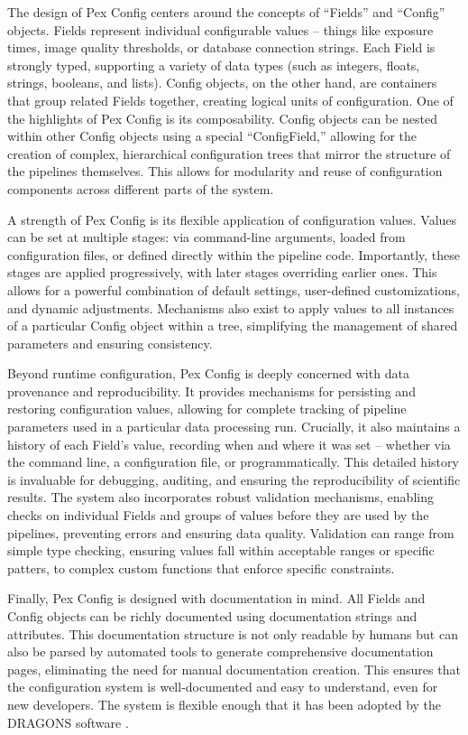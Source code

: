 The design of Pex Config centers around the concepts of ``Fields'' and ``Config'' objects.
Fields represent individual configurable values -- things like exposure times, image quality thresholds, or database connection strings.
Each Field is strongly typed, supporting a variety of data types (such as integers, floats, strings, booleans, and lists).
Config objects, on the other hand, are containers that group related Fields together, creating logical units of configuration.
One of the highlights of Pex Config is its composability.
Config objects can be nested within other Config objects using a special ``ConfigField,'' allowing for the creation of complex, hierarchical configuration trees that mirror the structure of the pipelines themselves.
This allows for modularity and reuse of configuration components across different parts of the system.

A strength of Pex Config is its flexible application of configuration values.
Values can be set at multiple stages: via command-line arguments, loaded from configuration files, or defined directly within the pipeline code.
Importantly, these stages are applied progressively, with later stages overriding earlier ones.
This allows for a powerful combination of default settings, user-defined customizations, and dynamic adjustments.
Mechanisms also exist to apply values to all instances of a particular Config object within a tree, simplifying the management of shared parameters and ensuring consistency.


Beyond runtime configuration, Pex Config is deeply concerned with data provenance and reproducibility.
It provides mechanisms for persisting and restoring configuration values, allowing for complete tracking of pipeline parameters used in a particular data processing run.
Crucially, it also maintains a history of each Field's value, recording when and where it was set -- whether via the command line, a configuration file, or programmatically.
This detailed history is invaluable for debugging, auditing, and ensuring the reproducibility of scientific results.
The system also incorporates robust validation mechanisms, enabling checks on individual Fields and groups of values before they are used by the pipelines, preventing errors and ensuring data quality.
Validation can range from simple type checking, ensuring values fall within acceptable ranges or specific patters, to complex custom functions that enforce specific constraints.


Finally, Pex Config is designed with documentation in mind.
All Fields and Config objects can be richly documented using documentation strings and attributes.
This documentation structure is not only readable by humans but can also be parsed by automated tools to generate comprehensive documentation pages, eliminating the need for manual documentation creation.
This ensures that the configuration system is well-documented and easy to understand, even for new developers.
The system is flexible enough that it has been adopted by the DRAGONS software \citep{2023RNAAS...7..214L}.

